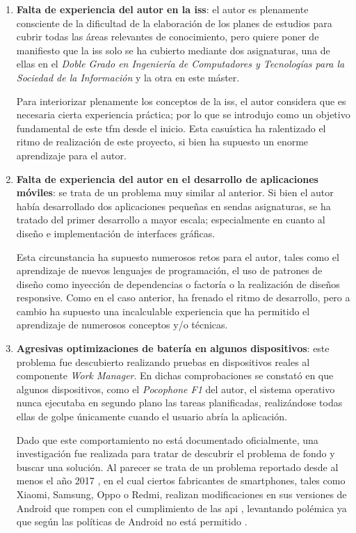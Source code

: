     \begin{enumerate}
        \item \textbf{Falta de experiencia del autor en la \gls{iss}}: el autor es plenamente consciente de la dificultad de la elaboración de los planes de estudios para cubrir todas las áreas relevantes de conocimiento, pero quiere poner de manifiesto que la \gls{iss} solo se ha cubierto mediante dos asignaturas, una de ellas en el \textit{Doble Grado en Ingeniería de Computadores y Tecnologías para la Sociedad de la Información} y la otra en este máster.
        
        Para interiorizar plenamente los conceptos de la \gls{iss}, el autor considera que es necesaria cierta experiencia práctica; por lo que se introdujo como un objetivo fundamental de este \gls{tfm} desde el inicio. Esta casuística ha ralentizado el ritmo de realización de este proyecto, si bien ha supuesto un enorme aprendizaje para el autor.
        
        \item \textbf{Falta de experiencia del autor en el desarrollo de aplicaciones móviles}: se trata de un problema muy similar al anterior. Si bien el autor había desarrollado dos aplicaciones pequeñas en sendas asignaturas, se ha tratado del primer desarrollo a mayor escala; especialmente en cuanto al diseño e implementación de interfaces gráficas.
    
        Esta circunstancia ha supuesto numerosos retos para el autor, tales como el aprendizaje de nuevos lenguajes de programación, el uso de patrones de diseño como inyección de dependencias o factoría o la realización de diseños \gls{responsive}. Como en el caso anterior, ha frenado el ritmo de desarrollo, pero a cambio ha supuesto una incalculable experiencia que ha permitido el aprendizaje de numerosos conceptos y/o técnicas.
    
        \item \label{resultados:problemas:planificador} \textbf{Agresivas optimizaciones de batería en algunos dispositivos}: este problema fue descubierto realizando pruebas en dispositivos reales al componente \textit{Work Manager}. En dichas comprobaciones se constató en que algunos dispositivos, como el \textit{Pocophone F1} del autor, el sistema operativo nunca ejecutaba en segundo plano las tareas planificadas, realizándose todas ellas de golpe únicamente cuando el usuario abría la aplicación.
    
        Dado que este comportamiento no está documentado oficialmente, una investigación fue realizada para tratar de descubrir el problema de fondo y buscar una solución. Al parecer se trata de un problema reportado desde al menos el año 2017 \cite{mathew_why_2017}, en el cual ciertos fabricantes de \glspl{smartphone}, tales como Xiaomi, Samsung, Oppo o Redmi, realizan modificaciones en sus versiones de Android que rompen con el cumplimiento de las \gls{api} \cite{android_public_tracker_chinese_nodate} \cite{android_public_tracker_request_nodate}, levantando polémica ya que según las políticas de Android no está permitido \cite{cylon999_workmanager_2018}.
    

\end{enumerate}
